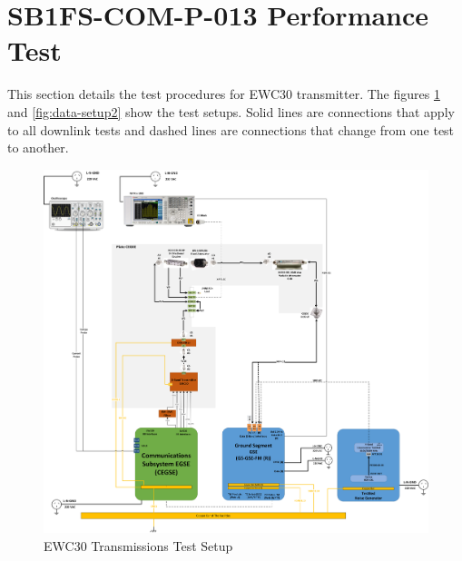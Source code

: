

\renewcommand{\reqid}{N/A}
\renewcommand{\procid}{SB1FS-COM-P-013}
\renewcommand{\procname}{Performance Test}

\section{\procid{} \procname{}} \label{sec:SB1FS-COM-P-013}

 This section details the test procedures for EWC30 transmitter.
 The figures \ref{fig:data-setup1} and  \ref{fig:data-setup2} show the test setups.
 Solid lines are connections that apply to all downlink tests and dashed 
 lines are connections that change from one test to another.

\begin{figure}[H]\centering
	\includegraphics[width=1\linewidth]{figuras/EWC30-PXA-Setup1.png}  
	\caption{EWC30 Transmissions Test Setup}
  \label{fig:data-setup1}
\end{figure}

